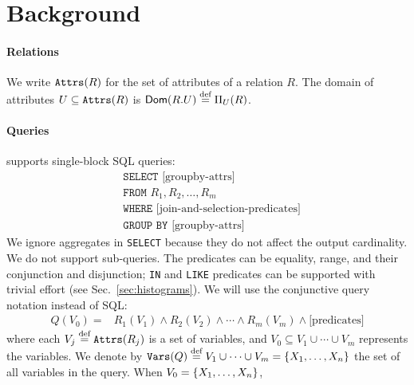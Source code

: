 \section{Background}
\label{sec:background}

\paragraph{Relations}
We write $\texttt{Attrs}(R)$ for the set of attributes of a relation $R$.  The domain of attributes $U \subseteq \texttt{Attrs}(R)$  is $\textsf{Dom}(R.U) \stackrel{\text{def}}{=} \Pi_U(R)$.

\paragraph{Queries}
\system supports single-block SQL queries:
%
\begin{align*}
  & \texttt{SELECT } \text{[groupby-attrs]}\\
  & \texttt{FROM } R_1, R_2, \ldots, R_m \\
  & \texttt{WHERE } \text{[join-and-selection-predicates]}\\
  & \texttt{GROUP BY }\text{[groupby-attrs]}
\end{align*}
%
We ignore aggregates in \texttt{SELECT} because they do not affect the output cardinality.
We do not support sub-queries.  The predicates can be equality, range, and their conjunction and disjunction; 
\texttt{IN} and \texttt{LIKE} predicates can be supported with trivial
effort (see Sec.~\ref{sec:histograms}).
%
%
We will use the conjunctive query notation instead of SQL:
%
\begin{align}
  Q(V_0) = & R_1(V_1) \wedge R_2(V_2) \wedge \cdots \wedge R_m(V_m)\wedge\text{[predicates]} \label{eq:cq}
\end{align}
%
where each $V_j\stackrel{\text{def}}{=} \texttt{Attrs}(R_j)$ is a set of variables, and
$V_0 \subseteq V_1 \cup \cdots \cup V_m$ represents the \groupby
variables.  We denote by
$\texttt{Vars}(Q) \stackrel{\text{def}}{=} V_1 \cup \cdots \cup V_m = \{X_1, \ldots, X_n\}$
the set of all variables in the query.  When $V_0=\{X_1, \ldots, X_n\}$, 
